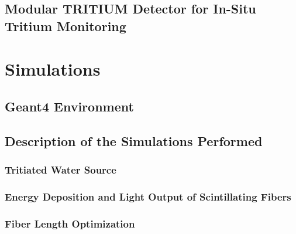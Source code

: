 \documentclass[12pt,a4paper]{book}
\begin{document}
	\section[Modular TRITIUM Detector]{Modular TRITIUM Detector for In-Situ Tritium Monitoring}\label{sec:TritiumMonitor}
	
	\newpage

\chapter{Simulations}  \label{chap:Simulations}
	
	
	\section{Geant4 Environment}\label{sec:Geant4Environment}
	
	
	\section{Description of the Simulations Performed}\label{sec:SimulationsPerformed}
	
	
		\subsection[Tritiated Water Source]{Tritiated Water Source}\label{subsec:SourceShapeSimulation}
		
		
		\subsection[Energy Deposition and Light Output of Scintillating Fibers]{Energy Deposition and Light Output of Scintillating Fibers}\label{subsec:LightOutputFibers}
		
		
		\subsection[Fiber Length]{Fiber Length Optimization}\label{subsec:FiberLengthSimulation}
		
				
\end{document}
